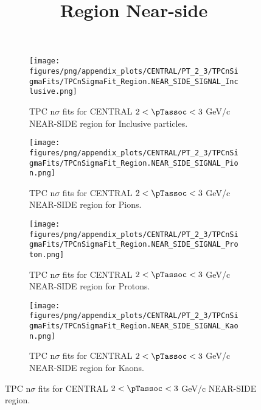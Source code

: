             \begin{figure}[H]
                \title{Region Near-side}
                \begin{subfigure}[b]{0.5\textwidth}
                    \centering
                    \texttt{[image: figures/png/appendix\_plots/CENTRAL/PT\_2\_3/TPCnSigmaFits/TPCnSigmaFit\_Region.NEAR\_SIDE\_SIGNAL\_Inclusive.png]}
                    \caption{TPC n$\sigma$ fits for CENTRAL $2 < \pTassoc < 3$ GeV/c NEAR-SIDE region for Inclusive particles.}
                    \label{fig:appendix_CENTRAL_$2 < \pTassoc < 3$ GeV/c_NEAR_SIDE_SIGNAL_Inclusive}
                \end{subfigure}
                \begin{subfigure}[b]{0.5\textwidth}
                    \centering
                    \texttt{[image: figures/png/appendix\_plots/CENTRAL/PT\_2\_3/TPCnSigmaFits/TPCnSigmaFit\_Region.NEAR\_SIDE\_SIGNAL\_Pion.png]}
                    \caption{TPC n$\sigma$ fits for CENTRAL $2 < \pTassoc < 3$ GeV/c NEAR-SIDE region for Pions.}
                    \label{fig:appendix_CENTRAL_$2 < \pTassoc < 3$ GeV/c_NEAR_SIDE_SIGNAL_Pion}
                \end{subfigure}
                \begin{subfigure}[b]{0.5\textwidth}
                    \centering
                    \texttt{[image: figures/png/appendix\_plots/CENTRAL/PT\_2\_3/TPCnSigmaFits/TPCnSigmaFit\_Region.NEAR\_SIDE\_SIGNAL\_Proton.png]}
                    \caption{TPC n$\sigma$ fits for CENTRAL $2 < \pTassoc < 3$ GeV/c NEAR-SIDE region for Protons.}
                    \label{fig:appendix_CENTRAL_$2 < \pTassoc < 3$ GeV/c_NEAR_SIDE_SIGNAL_Proton}
                \end{subfigure}
                \begin{subfigure}[b]{0.5\textwidth}
                    \centering
                    \texttt{[image: figures/png/appendix\_plots/CENTRAL/PT\_2\_3/TPCnSigmaFits/TPCnSigmaFit\_Region.NEAR\_SIDE\_SIGNAL\_Kaon.png]}
                    \caption{TPC n$\sigma$ fits for CENTRAL $2 < \pTassoc < 3$ GeV/c NEAR-SIDE region for Kaons.}
                    \label{fig:appendix_CENTRAL_$2 < \pTassoc < 3$ GeV/c_NEAR_SIDE_SIGNAL_Kaon}
                \end{subfigure}
                \caption{TPC n$\sigma$ fits for CENTRAL $2 < \pTassoc < 3$ GeV/c NEAR-SIDE region.}
                \label{fig:appendix_CENTRAL_$2 < \pTassoc < 3$ GeV/c_NEAR_SIDE_SIGNAL}
            \end{figure}

